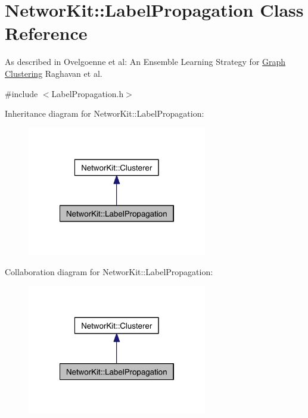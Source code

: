 \hypertarget{class_networ_kit_1_1_label_propagation}{\section{Networ\-Kit\-:\-:Label\-Propagation Class Reference}
\label{class_networ_kit_1_1_label_propagation}
}


As described in Ovelgoenne et al\-: An Ensemble Learning Strategy for \hyperlink{class_networ_kit_1_1_graph}{Graph} \hyperlink{class_networ_kit_1_1_clustering}{Clustering} Raghavan et al.  




{\ttfamily \#include $<$Label\-Propagation.\-h$>$}



Inheritance diagram for Networ\-Kit\-:\-:Label\-Propagation\-:\nopagebreak
\begin{figure}[H]
\begin{center}
\leavevmode
\includegraphics[width=222pt]{class_networ_kit_1_1_label_propagation__inherit__graph}
\end{center}
\end{figure}


Collaboration diagram for Networ\-Kit\-:\-:Label\-Propagation\-:\nopagebreak
\begin{figure}[H]
\begin{center}
\leavevmode
\includegraphics[width=222pt]{class_networ_kit_1_1_label_propagation__coll__graph}
\end{center}
\end{figure}
